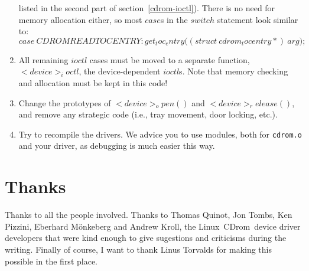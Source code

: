 \documentclass{article}
\def\linux{{\sc Linux}}
\def\cdrom{{\sc CDrom}}
\begin{document}
\begin{enumerate}
listed in the second part of section~\ref{cdrom-ioctl}). There is no
need for memory allocation either, so most $case$s in the $switch$
statement look similar to:
$$
case\ CDROMREADTOCENTRY\colon
get_toc_entry\bigl((struct\ cdrom_tocentry *{})\ arg\bigr);
$$
\item All remaining $ioctl$ cases must be moved to a separate
function, $<device>_ioctl$, the device-dependent $ioctl$s. Note that
memory checking and allocation must be kept in this code!
\item Change the prototypes of $<device>_open()$ and
$<device>_release()$, and remove any strategic code (i.e., tray
movement, door locking, etc.). 
\item Try to recompile the drivers. We advice you to use modules, both
for {\tt cdrom.o} and your driver, as debugging is much easier this
way.
\end{enumerate} 

\section{Thanks}

Thanks to all the people involved. Thanks to Thomas Quinot, Jon Tombs,
Ken Pizzini, Eberhard M\"onkeberg and Andrew Kroll, the \linux\ 
\cdrom\ device driver developers that were kind enough to give
sugestions and criticisms during the writing. Finally of course, I
want to thank Linus Torvalds for making this possible in the first
place.
\end{document}
